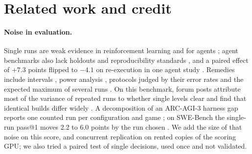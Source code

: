 \section{Related work and credit}\label{sec:related}

\paragraph{Noise in evaluation.}
Single runs are weak evidence in reinforcement learning \citep{henderson2017matters} and for agents \citep{bjarnason2026randomness,anthropic2026infranoise}; agent benchmarks also lack holdouts and reproducibility standards \citep{kapoor2024agentsmatter}, and a paired effect of $+7.3$ points flipped to $-4.1$ on re-execution in one agent study \citep{alhamidi2026reexecution}.
Remedies include intervals \citep{agarwal2021precipice}, power analysis \citep{colas2018seeds,miller2024errorbars}, protocols judged by their error rates \citep{bouthillier2021variance} and the expected maximum of several runs \citep{dodge2019showyourwork}.
On this benchmark, forum posts attribute most of the variance of repeated runs to whether single levels clear \citep{borro19802026forum732932} and find that identical builds differ widely \citep{makarov2026forum743723}. A decomposition of an ARC-AGI-3 harness gap reports one counted run per configuration and game \citep{lencevicius2026persistgym}; on SWE-Bench the single-run pass@1 moves 2.2 to 6.0 points by the run chosen \citep{bjarnason2026randomness}. %
We add the size of that noise on this score, and concurrent replication on rented copies of the scoring GPU; we also tried a paired test of single decisions, used once and not validated.

